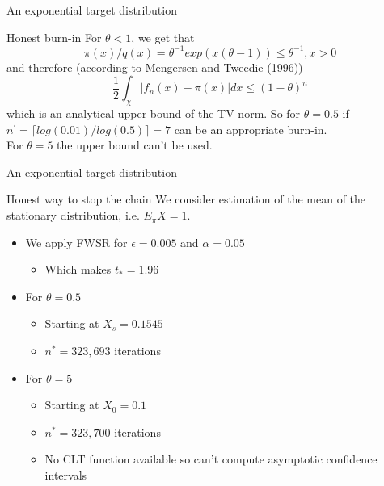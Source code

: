 \documentclass{beamer}
\begin{document}
\begin{frame}{An exponential target distribution}
  \begin{block}{Honest burn-in}
    For $\theta < 1$, we get that
    \[
      \pi(x) / q(x) = \theta^{-1}exp(x(\theta-1)) \leq \theta^{-1}, x > 0
    \]
    and therefore (according to Mengersen and Tweedie (1996))
    \[
      \frac{1}{2}\int_{\chi}|f_n(x)-\pi(x)|dx \leq (1-\theta)^n
    \]
    which is an analytical upper bound of the TV norm. So for $\theta = 0.5$ if $n^\prime = \lceil log(0.01)/log(0.5)\rceil = 7$ can be an appropriate burn-in.\\
    For $\theta = 5$ the upper bound can't be used.
  \end{block}
\end{frame}

\begin{frame}{An exponential target distribution}
  \begin{block}{Honest way to stop the chain}
    We consider estimation of the mean of the stationary distribution, i.e. $E_\pi X = 1$.
    \begin{itemize}
      \item We apply FWSR for $\epsilon = 0.005$ and $\alpha = 0.05$
        \begin{itemize}
          \item Which makes $t_* = 1.96$
        \end{itemize}
    \end{itemize}
    \begin{itemize}
      \item For $\theta = 0.5$
        \begin{itemize}
          \item Starting at $X_s = 0.1545$
          \item $n^* = 323,693$ iterations
        \end{itemize}
      \item For $\theta = 5$
        \begin{itemize}
          \item Starting at $X_0 = 0.1$
          \item $n^* = 323,700$ iterations
          \item No CLT function available so can't compute asymptotic confidence intervals
        \end{itemize}
    \end{itemize}
  \end{block}
\end{frame}
\end{document}
